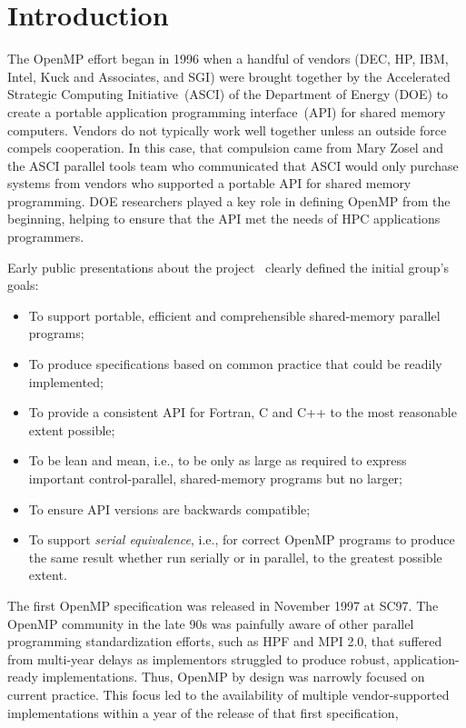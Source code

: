 \section{Introduction}
\label{sec:intro}

The OpenMP effort began in 1996 when a handful of vendors (DEC, HP, IBM, 
Intel, Kuck and Associates, and SGI) were brought together by the Accelerated 
Strategic Computing Initiative~(ASCI) of the Department of Energy (DOE) to 
create a portable application programming interface~(API) for shared memory 
computers. Vendors do not typically work well together unless an outside 
force compels cooperation. In this case, that compulsion came from Mary 
Zosel and the ASCI parallel tools team who communicated that ASCI would 
only purchase systems from vendors who supported a portable API for shared 
memory programming. DOE researchers played a key role in defining OpenMP 
from the beginning, helping to ensure that the API met the needs of HPC 
applications programmers.

Early public presentations about the project~\cite{ewomp99} clearly
defined the initial group's goals:

\begin{itemize}
  \item To support portable, efficient and comprehensible shared-memory 
        parallel programs;
  \item To produce specifications based on common practice that 
        could be readily implemented;
  \item To provide a consistent API for Fortran, C and C++ to the 
        most reasonable extent possible;
  \item To be lean and mean, i.e., to  be only as large as required 
        to express important control-parallel, shared-memory programs  
        but no larger;
  \item To ensure API versions are backwards compatible;
  \item To support \emph{serial equivalence}, i.e., for correct OpenMP 
        programs to produce the same result whether run serially or in
        parallel, to the greatest possible extent.
\end{itemize}

The first OpenMP specification  was released in November 1997 at SC97. The
OpenMP community in the late 90s was painfully aware of other parallel
programming  standardization efforts, such as HPF and MPI 2.0, that
suffered from multi-year delays as implementors struggled to produce robust,
application-ready implementations. Thus, OpenMP by design was narrowly
focused on current practice. This focus led to the availability of multiple
vendor-supported implementations within a year of the release of that 
first specification, 

